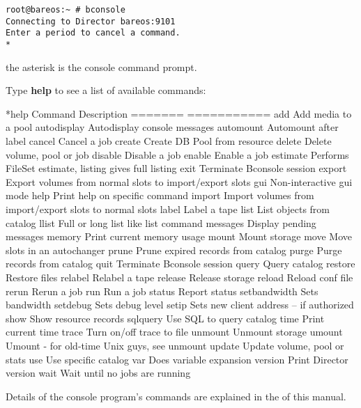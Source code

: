\footnotesize
\begin{verbatim}
root@bareos:~ # bconsole 
Connecting to Director bareos:9101
Enter a period to cancel a command.
*
\end{verbatim}
\normalsize

the asterisk is the console command prompt.

Type {\bf help} to see a list of available commands:

\begin{bconsole}{*}{help}{}{}
  Command       Description
  =======       ===========
  add           Add media to a pool
  autodisplay   Autodisplay console messages
  automount     Automount after label
  cancel        Cancel a job
  create        Create DB Pool from resource
  delete        Delete volume, pool or job
  disable       Disable a job
  enable        Enable a job
  estimate      Performs FileSet estimate, listing gives full listing
  exit          Terminate Bconsole session
  export        Export volumes from normal slots to import/export slots
  gui           Non-interactive gui mode
  help          Print help on specific command
  import        Import volumes from import/export slots to normal slots
  label         Label a tape
  list          List objects from catalog
  llist         Full or long list like list command
  messages      Display pending messages
  memory        Print current memory usage
  mount         Mount storage
  move          Move slots in an autochanger
  prune         Prune expired records from catalog
  purge         Purge records from catalog
  quit          Terminate Bconsole session
  query         Query catalog
  restore       Restore files
  relabel       Relabel a tape
  release       Release storage
  reload        Reload conf file
  rerun         Rerun a job
  run           Run a job
  status        Report status
  setbandwidth  Sets bandwidth
  setdebug      Sets debug level
  setip         Sets new client address -- if authorized
  show          Show resource records
  sqlquery      Use SQL to query catalog
  time          Print current time
  trace         Turn on/off trace to file
  unmount       Unmount storage
  umount        Umount - for old-time Unix guys, see unmount
  update        Update volume, pool or stats
  use           Use specific catalog
  var           Does variable expansion
  version       Print Director version
  wait          Wait until no jobs are running
\end{bconsole}

Details of the console program's commands are explained in the
 of this manual.

